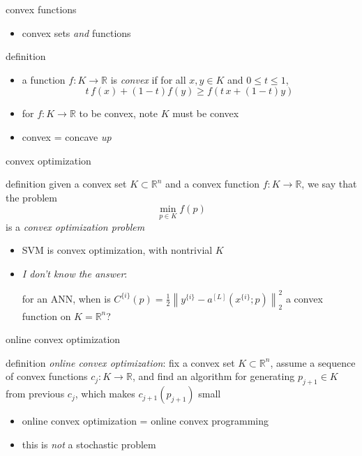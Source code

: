 \documentclass[xcolor={svgnames},
               hyperref={colorlinks,citecolor=DeepPink4,linkcolor=FireBrick,urlcolor=Maroon}]
               {beamer}
\newcommand{\RR}{\mathbb{R}}
\begin{document}
\begin{frame}{convex functions}

\begin{itemize}
\item convex sets \emph{and} functions
\end{itemize}

\begin{block}{definition}
\begin{itemize}
\item a function $f:K \to \RR$ is \emph{convex} if for all $x,y \in K$ and $0 \le t \le 1$,
  $$t\, f(x) + (1-t) f(y) \ge f(t\, x + (1-t) y)$$
\end{itemize}
\end{block}

\begin{itemize}
\item for $f:K\to \RR$ to be convex, note $K$ must be convex
\item convex = concave \emph{up}
\end{itemize}
\end{frame}


\begin{frame}{convex optimization}

\begin{block}{definition}
given a convex set $K \subset \RR^n$ and a convex function $f:K\to \RR$, we say that the problem
    $$\min_{p \in K} f(p)$$
is a \emph{convex optimization problem}
\end{block}

\begin{itemize}
\item SVM is convex optimization, with nontrivial $K$
\item \emph{I don't know the answer}:

for an ANN, when is $C^{\{i\}}(p) = \frac{1}{2} \left\|y^{\{i\}} - a^{[L]}(x^{\{i\}}; p)\right\|_2^2$ a convex function on $K = \RR^n$?
\end{itemize}
\end{frame}


\begin{frame}{online convex optimization}

\begin{block}{definition}
\emph{online convex optimization}:  fix a convex set $K\subset \RR^n$, assume a sequence of convex functions $c_j:K\to \RR$, and find an algorithm for generating $p_{j+1} \in K$ from previous $c_j$, which makes $c_{j+1}(p_{j+1})$ small
\end{block}

\begin{itemize}
\item online convex optimization = online convex programming
\item this is \emph{not} a stochastic problem
\end{itemize}
\end{frame}
\end{document}
